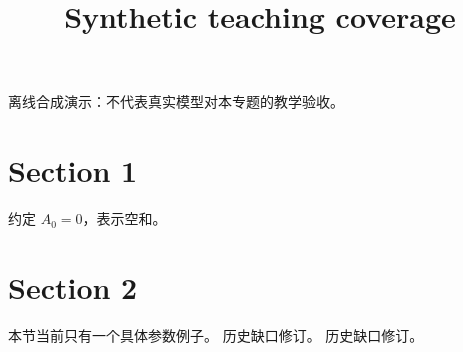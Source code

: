\documentclass[UTF8,fontset=fandol,11pt]{ctexart}
\title{Synthetic teaching coverage}
\date{}
\begin{document}
\maketitle
\par\noindent 离线合成演示：不代表真实模型对本专题的教学验收。\par
\section{Section 1}\label{sec:S01}
约定 $A_0=0$，表示空和。\par
\section{Section 2}\label{sec:S02}
本节当前只有一个具体参数例子。 历史缺口修订。 历史缺口修订。\par
\end{document}
